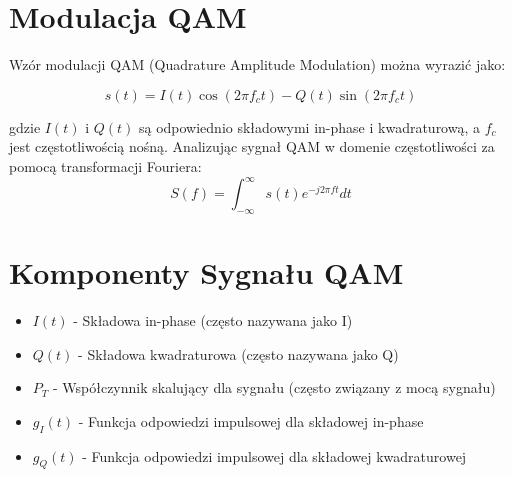 
\section{Modulacja QAM}

Wzór modulacji QAM (Quadrature Amplitude Modulation) można wyrazić jako:

\[
s(t) = I(t) \cos(2 \pi f_c t) - Q(t) \sin(2 \pi f_c t)
\]

gdzie $I(t)$ i $Q(t)$ są odpowiednio składowymi in-phase i kwadraturową, a $f_c$ jest częstotliwością nośną. Analizując sygnał QAM w domenie częstotliwości za pomocą transformacji Fouriera:
\[
S(f) = \int_{-\infty}^{\infty} s(t) e^{-j 2 \pi f t} dt
\]

\section{Komponenty Sygnału QAM}
\begin{itemize}
    \item $I(t)$ - Składowa in-phase (często nazywana jako I)
    \item $Q(t)$ - Składowa kwadraturowa (często nazywana jako Q)
    \item $P_T$ - Współczynnik skalujący dla sygnału (często związany z mocą sygnału)
    \item $g_I(t)$ - Funkcja odpowiedzi impulsowej dla składowej in-phase
    \item $g_Q(t)$ - Funkcja odpowiedzi impulsowej dla składowej kwadraturowej
\end{itemize}
